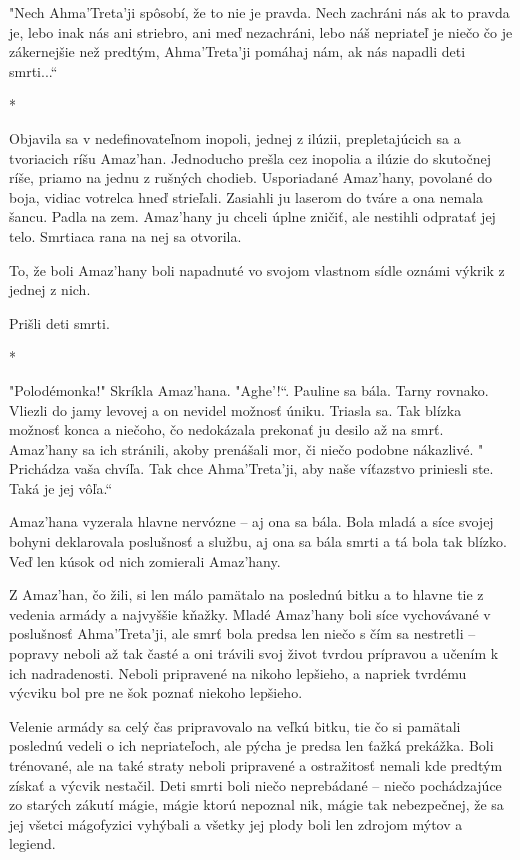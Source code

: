 \documentclass{book}
\begin{document}
"$ $Nech Ahma'Treta'ji spôsobí, že to nie je pravda. Nech zachráni nás ak to pravda je, lebo inak nás ani striebro, ani meď nezachráni, lebo náš nepriateľ je niečo čo je zákernejšie než predtým, Ahma'Treta'ji pomáhaj nám, ak nás napadli deti smrti...“

\begin{center}
*
\end{center}

Objavila sa v nedefinovateľnom inopoli, jednej z ilúzii, prepletajúcich sa a tvoriacich ríšu Amaz'han. Jednoducho prešla cez inopolia a ilúzie do skutočnej ríše, priamo na jednu z rušných chodieb. Usporiadané Amaz'hany, povolané do boja, vidiac votrelca hneď strieľali. Zasiahli ju laserom do tváre a ona nemala šancu. Padla na zem. Amaz'hany ju chceli úplne zničiť, ale nestihli odpratať jej telo. Smrtiaca rana na nej sa otvorila.

To, že boli Amaz'hany boli napadnuté vo svojom vlastnom sídle oznámi výkrik z jednej z nich.

Prišli deti smrti.

\begin{center}
*
\end{center}

"$ $Polodémonka!"$ $ Skríkla Amaz'hana. "$ $Aghe'!“. Pauline sa bála. Tarny rovnako. Vliezli do jamy levovej a on nevidel možnosť úniku. Triasla sa. Tak blízka možnosť konca a niečoho, čo nedokázala prekonať ju desilo až na smrť. Amaz'hany sa ich stránili, akoby prenášali mor, či niečo podobne nákazlivé. "$ $Prichádza vaša chvíľa. Tak chce Ahma'Treta'ji, aby naše víťazstvo priniesli ste. Taká je jej vôľa.“

Amaz'hana vyzerala hlavne nervózne – aj ona sa bála. Bola mladá a síce svojej bohyni deklarovala poslušnosť a službu, aj ona sa bála smrti a tá bola tak blízko. Veď len kúsok od nich zomierali Amaz'hany.

Z Amaz'han, čo žili, si len málo pamätalo na poslednú bitku a to hlavne tie z vedenia armády a najvyššie kňažky. Mladé Amaz'hany boli síce vychovávané v poslušnosť Ahma'Treta'ji, ale smrť bola predsa len niečo s čím sa nestretli – popravy neboli až tak časté a oni trávili svoj život tvrdou prípravou a učením k ich nadradenosti. Neboli pripravené na nikoho lepšieho, a napriek tvrdému výcviku bol pre ne šok poznať niekoho lepšieho.

Velenie armády sa celý čas pripravovalo na veľkú bitku, tie čo si pamätali poslednú vedeli o ich nepriateľoch, ale pýcha je predsa len ťažká prekážka. Boli trénované, ale na také straty neboli pripravené a ostražitosť nemali kde predtým získať a výcvik nestačil. Deti smrti boli niečo neprebádané – niečo pochádzajúce zo starých zákutí mágie, mágie ktorú nepoznal nik, mágie tak nebezpečnej, že sa jej všetci mágofyzici vyhýbali a všetky jej plody boli len zdrojom mýtov a legiend.
\end{document}
